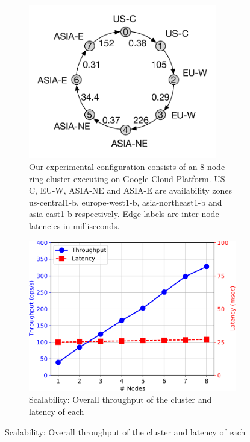 \begin{figure}[t]
  \centering
	\begin{subfigure}{0.45\textwidth}
		\includegraphics[width=0.9\textwidth]{Figures/cluster.pdf}
		\caption{Our experimental configuration consists of an 8-node ring cluster
			executing on Google Cloud Platform. US-C, EU-W, ASIA-NE and ASIA-E
			are availability zones us-central1-b, europe-west1-b, asia-northeast1-b
			and asia-east1-b respectively. Edge labels are inter-node latencies in
		milliseconds.}
		\label{fig:cluster}
	\end{subfigure}
	\hfill
	\begin{subfigure}{0.45\textwidth}
		\includegraphics[width=\textwidth]{Graphs/scalability.pdf}
		\caption{Scalability: Overall throughput of the cluster and latency of each
}
\end{subfigure}
\end{figure}
